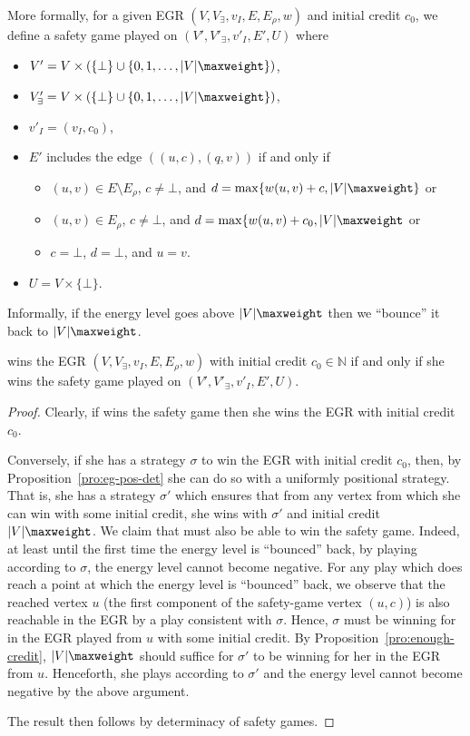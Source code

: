 \documentclass[a4paper]{article}
\begin{document}
More formally, for a given EGR $(V,V_\exists,v_I,E,E_\rho,w)$
and initial credit $c_0$, we define a safety game played on
$(V',V'_\exists,v'_I,E',U)$ where
\begin{itemize}[nolistsep]
	\item $V' = V \times \left(\{\bot\} \cup \{0, 1, \dots,
		|V|\maxweight\}\right)$,
	\item $V'_\exists = V \times \left(\{\bot\} \cup
		\{0,1,\dots,|V|\maxweight\} \right)$,
	\item $v'_I = (v_I,c_0)$,
	\item $E'$ includes the edge $( (u,c), (q,v) )$ if and only
		if
		\begin{itemize}[nolistsep]
			\item $(u,v) \in E \setminus E_\rho$, $c \neq \bot$,
				and $d = \max\{w(u,v) + c,
				|V|\maxweight\}$ or
			\item $(u,v) \in E_\rho$, $c \neq \bot$, 
				and $d = \max\{w(u,v) + c_0, |V|\maxweight$ or
			\item $c = \bot$, $d = \bot$, and $u = v$.
		\end{itemize}
	\item $U = V \times \{\bot\}$.
\end{itemize}
Informally, if the energy level goes above $|V|\maxweight$ then we ``bounce'' it
back to $|V|\maxweight$.

\begin{proposition}\label{pro:eg-to-safe}
	\eve wins the EGR $(V,V_\exists,v_I,E,E_\rho,w)$
	with initial credit $c_0 \in \mathbb{N}$ if and only if
	she wins the safety game played on $(V',V'_\exists,v'_I,E',U)$.
\end{proposition}
\begin{proof}
	Clearly, if \eve wins the safety game then she wins the EGR with initial
	credit $c_0$.
	
	Conversely, if she has a strategy $\sigma$ to win
	the EGR with initial credit $c_0$, then, by
	Proposition~\ref{pro:eg-pos-det} she can do so with a uniformly
	positional strategy. That is, she has a strategy $\sigma'$ which ensures
	that from any vertex from which she can win with some initial credit,
	she wins with $\sigma'$ and initial credit $|V|\maxweight$.
	We claim that \eve must also be able to win the safety game.
	Indeed, at least until the first time the energy level is ``bounced''
	back, by playing according to $\sigma$, the energy level cannot become
	negative. For any play which does reach a point at
	which the energy level is ``bounced'' back, we observe that the reached
	vertex $u$ (the first component of the safety-game vertex $(u,c)$) is also
	reachable in the EGR by a play consistent with $\sigma$. Hence, $\sigma$
	must be winning for \eve in the EGR played from $u$ with some initial
	credit. By Proposition~\ref{pro:enough-credit}, $|V|\maxweight$ should
	suffice for $\sigma'$ to be winning for her in the EGR from $u$.
	Henceforth, she plays according to $\sigma'$ and the energy level cannot
	become negative by the above argument.

	The result then follows by determinacy of safety games.
\end{proof}
\end{document}
